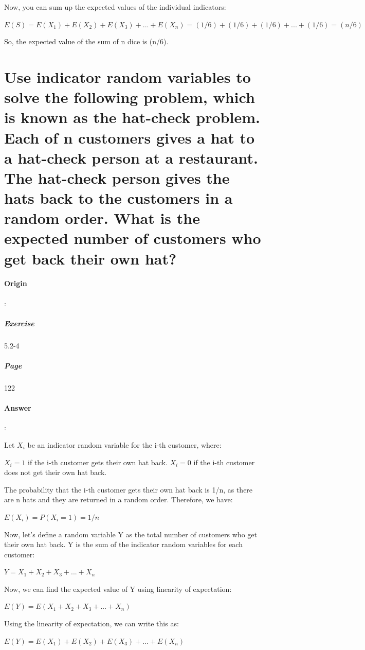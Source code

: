 \documentclass{article}
\begin{document}
Now, you can sum up the expected values of the individual indicators:

$ E(S) = E(X_1) + E(X_2) + E(X_3) + ... + E(X_n) = (1/6) + (1/6) + (1/6) + ... + (1/6) = (n/6) $

So, the expected value of the sum of n dice is (n/6).



  \section{Use indicator random variables to solve the following problem, which is known as the hat-check problem. Each of n customers gives a hat to a hat-check person at a restaurant. The hat-check person gives the hats back to the customers in a random order. What is the expected number of customers who get back their own hat?}

  \paragraph{Origin}:
    \subparagraph{Exercise}5.2-4
    \subparagraph{Page}122
  \paragraph{Answer}:

  Let $X_i$ be an indicator random variable for the i-th customer, where:

  $X_i = 1$ if the i-th customer gets their own hat back.
  $X_i = 0$ if the i-th customer does not get their own hat back.
  
  The probability that the i-th customer gets their own hat back is 1/n, as there are n hats and they are returned in a random order. Therefore, we have:
  
  $E(X_i) = P(X_i = 1) = 1/n$
  
  Now, let's define a random variable Y as the total number of customers who get their own hat back. Y is the sum of the indicator random variables for each customer:
  
  $Y = X_1 + X_2 + X_3 + ... + X_n$
  
  Now, we can find the expected value of Y using linearity of expectation:
  
  $E(Y) = E(X_1 + X_2 + X_3 + ... + X_n)$
  
  Using the linearity of expectation, we can write this as:
  
  $E(Y) = E(X_1) + E(X_2) + E(X_3) + ... + E(X_n)$
  
\end{document}
